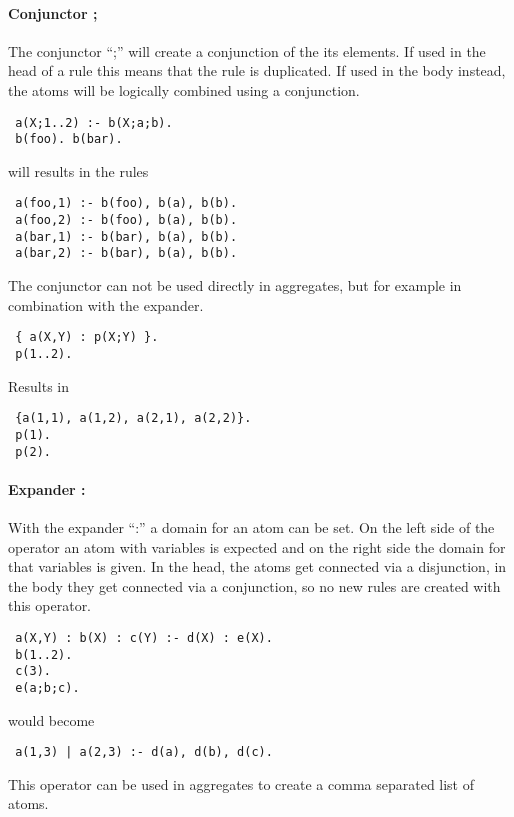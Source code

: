 \documentclass[a4paper,10pt]{article}
\begin{document}
\paragraph{Conjunctor ;}
The conjunctor ``;'' will create a conjunction of the its elements.
If used in the head of a rule this means that the rule is duplicated.
If used in the body instead, the atoms will be logically combined using a conjunction.
\begin{verbatim}
 a(X;1..2) :- b(X;a;b).
 b(foo). b(bar).
\end{verbatim}
will results in the rules
\begin{verbatim}
 a(foo,1) :- b(foo), b(a), b(b).
 a(foo,2) :- b(foo), b(a), b(b).
 a(bar,1) :- b(bar), b(a), b(b).
 a(bar,2) :- b(bar), b(a), b(b).
\end{verbatim}
The conjunctor can not be used directly in aggregates, but for example in combination with the expander.
\begin{verbatim}
 { a(X,Y) : p(X;Y) }.
 p(1..2).
\end{verbatim}
Results in
\begin{verbatim}
 {a(1,1), a(1,2), a(2,1), a(2,2)}.
 p(1).
 p(2).
\end{verbatim}

\paragraph{Expander :}
With the expander ``:'' a domain for an atom can be set.
On the left side of the operator an atom with variables is expected and on the right side the domain for that variables is given.
In the head, the atoms get connected via a disjunction, in the body they get connected via a conjunction, so no new rules are created with this operator.
\begin{verbatim}
 a(X,Y) : b(X) : c(Y) :- d(X) : e(X).
 b(1..2).
 c(3).
 e(a;b;c).
\end{verbatim}
would become
\begin{verbatim}
 a(1,3) | a(2,3) :- d(a), d(b), d(c).
\end{verbatim}
This operator can be used in aggregates to create a comma separated list of atoms.
\end{document}
